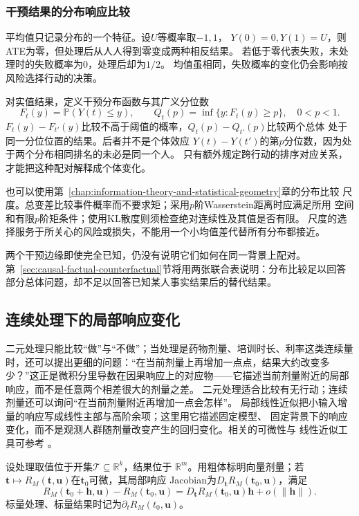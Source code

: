 \subsubsection{干预结果的分布响应比较}
\label{sec:causal-distribution-response}

平均值只记录分布的一个特征。设\(U\)等概率取\(-1,1\)，
\(Y(0)=0,Y(1)=U\)，则ATE为零，但处理后从人人得到零变成两种相反结果。
若低于零代表失败，未处理时的失败概率为\(0\)，处理后却为\(1/2\)。
均值虽相同，失败概率的变化仍会影响按风险选择行动的决策。

对实值结果，定义干预分布函数与其广义分位数
\[
  F_t(y)=\mathbb P(Y(t)\leq y),\qquad
  Q_t(p)=\inf\{y:F_t(y)\geq p\},\quad 0<p<1.
\]
\(F_t(y)-F_{t'}(y)\)比较不高于阈值的概率，\(Q_t(p)-Q_{t'}(p)\)比较两个总体
处于同一分位位置的结果。后者并不是个体效应
\(Y(t)-Y(t')\)的第\(p\)分位数，因为处于两个分布相同排名的未必是同一个人。
只有额外规定跨行动的排序对应关系，才能把这种配对解释成个体变化。

也可以使用第~\ref{chap:information-theory-and-statistical-geometry}章的分布比较
尺度。总变差比较事件概率而不要求矩；采用\(p\)阶Wasserstein距离时应满足所用
空间和有限\(p\)阶矩条件；使用KL散度则须检查绝对连续性及其值是否有限。
尺度的选择服务于所关心的风险或损失，不能用一个小均值差代替所有分布都接近。

两个干预边缘即使完全已知，仍没有说明它们如何在同一背景上配对。
第~\ref{sec:causal-factual-counterfactual}节将用两张联合表说明：分布比较足以回答
部分总体问题，却不足以回答已知某人事实结果后的替代结果。

\subsection{连续处理下的局部响应变化}
\label{sec:causal-local-response}

二元处理只能比较“做”与“不做”；当处理是药物剂量、培训时长、利率这类连续量时，还可以提出更细的问题：“在当前剂量上再增加一点点，结果大约改变多少？”这正是微积分里导数在因果响应上的对应物——它描述当前剂量附近的局部响应，而不是任意两个相差很大的剂量之差。
二元处理适合比较有无行动；连续剂量还可以询问“在当前剂量附近再增加一点会怎样”。
局部线性近似把小输入增量的响应写成线性主部与高阶余项；这里用它描述固定模型、
固定背景下的响应变化，而不是观测人群随剂量改变产生的回归变化。相关的可微性与
线性近似工具可参考
。

\begin{definition}[局部响应导数]
  \label{def:causal-local-response}
  设处理取值位于开集\(\mathcal T\subseteq\mathbb R^k\)，结果位于
  \(\mathbb R^m\)。用粗体标明向量剂量；若
  \(\bm t\mapsto R_M(\bm t,\bm u)\)在\(\bm t_0\)可微，其局部响应
  Jacobian为\(D_{\bm t}R_M(\bm t_0,\bm u)\)，满足
  \[
    R_M(\bm t_0+\bm h,\bm u)-R_M(\bm t_0,\bm u)
    =D_{\bm t}R_M(\bm t_0,\bm u)\bm h+o(\|\bm h\|).
  \]
  标量处理、标量结果时记为\(\partial_tR_M(t_0,\bm u)\)。
\end{definition}

